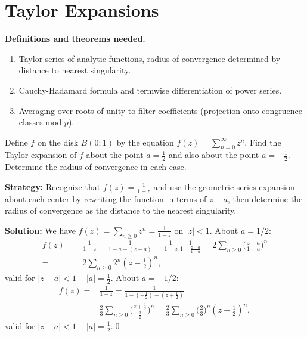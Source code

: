 \section{Taylor Expansions}

\noindent\textbf{Definitions and theorems needed.}
\begin{enumerate}[label=(\alph*)]
\item Taylor series of analytic functions, radius of convergence determined by distance to nearest singularity.
\item Cauchy-Hadamard formula and termwise differentiation of power series.
\item Averaging over roots of unity to filter coefficients (projection onto congruence classes mod $p$).
\end{enumerate}



\begin{problembox}
\begin{problemstatement}
Define \( f \) on the disk \( B(0; 1) \) by the equation \( f(z) = \sum_{n=0}^{\infty} z^n \). Find the Taylor expansion of \( f \) about the point \( a = \frac{1}{2} \) and also about the point \( a = -\frac{1}{2} \). Determine the radius of convergence in each case.
\end{problemstatement}
\end{problembox}

\noindent\textbf{Strategy:} Recognize that \( f(z) = \frac{1}{1-z} \) and use the geometric series expansion about each center by rewriting the function in terms of \( z-a \), then determine the radius of convergence as the distance to the nearest singularity.

\bigskip\noindent\textbf{Solution:}
We have $f(z)=\sum_{n\ge0}z^n=\frac{1}{1-z}$ on $|z|<1$. About $a=1/2$:
\begin{align*}
f(z)=&\frac{1}{1-z}=\frac{1}{1-a-(z-a)}=\frac{1}{1-a}\,\frac{1}{1-\frac{z-a}{1-a}}=2\sum_{n\ge0}\Big(\frac{z-a}{1-a}\Big)^n \\
=&2\sum_{n\ge0}2^n(z-\tfrac12)^n,
\end{align*}
valid for $|z-a|<1-|a|=\tfrac12$. About $a=-1/2$:
\begin{align*}
f(z)=&\frac{1}{1-z}=\frac{1}{1-(-\tfrac12)-(z+\tfrac12)}\\
=&\frac{2}{3}\sum_{n\ge0}\Big(\frac{z+\tfrac12}{\tfrac32}\Big)^n=\frac{2}{3}\sum_{n\ge0}\Big(\frac{2}{3}\Big)^n(z+\tfrac12)^n,
\end{align*}
valid for $|z-a|<1-|a|=\tfrac12$.\qed


